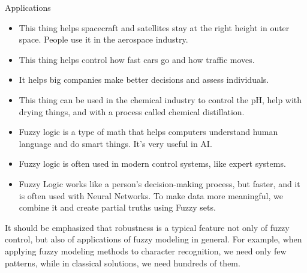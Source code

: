 Applications
\begin{itemize}
    \item This thing helps spacecraft and satellites stay at the right height in outer space. People use it in the aerospace industry.
\item This thing helps control how fast cars go and how traffic moves.
\item It helps big companies make better decisions and assess individuals.
\item This thing can be used in the chemical industry to control the pH, help with drying things, and with a process called chemical distillation.
\item Fuzzy logic is a type of math that helps computers understand human language and do smart things. It's very useful in AI.
\item Fuzzy logic is often used in modern control systems, like expert systems.
\item Fuzzy Logic works like a person's decision-making process, but faster, and it is often used with Neural Networks. To make data more meaningful, we combine it and create partial truths using Fuzzy sets.
\end{itemize}

It should be emphasized that robustness is a typical feature not only of fuzzy
control, but also of applications of fuzzy modeling in general. For example, when
applying fuzzy modeling methods to character recognition, we need only few patterns, while in classical solutions, we need hundreds of them. 
